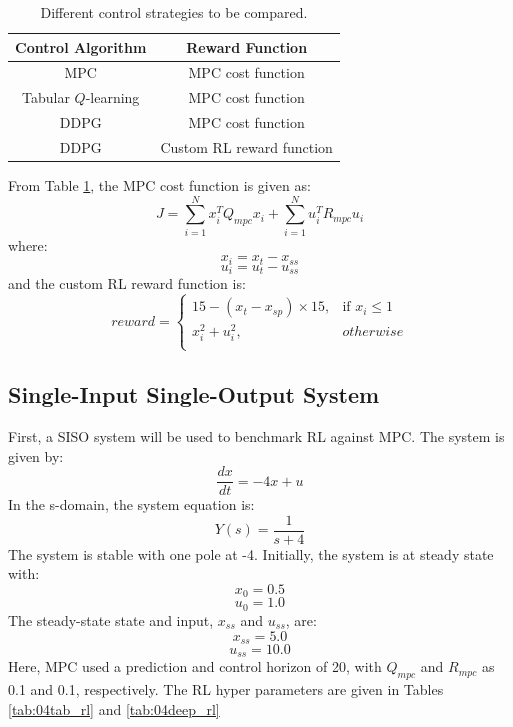 \begin{table}[H]
\caption{Different control strategies to be compared.}
\centering
\begin{tabular}{c|c}
\textbf{Control Algorithm} & \textbf{Reward Function}\\
\hline
MPC		                & MPC cost function		 \\
Tabular $Q$-learning    & MPC cost function		 \\
DDPG	                & MPC cost function		 \\
DDPG         	        & Custom RL reward function	
\label{tab:04control_and_cost}
\end{tabular}
\end{table}

From Table \ref{tab:04control_and_cost}, the MPC cost function is given as:
\begin{equation}
    J = \sum\limits^{N}_{i = 1} x_i^TQ_{mpc}x_i + \sum\limits^N_{i=1}u_i^TR_{mpc}u_i
    \label{eq:04mpc_cost}
\end{equation}
where:
$$x_i = x_t - x_{ss}$$ 
$$u_i = u_t - u_{ss}$$ 
and the custom RL reward function is:
\[
    reward = 
\begin{cases}
    15 - (x_t - x_{sp}) \times 15,              & \text{if } x_i \leq 1 \\
    x_i^2 + u_i^2,              & otherwise \\
    \label{eq:04rl_cost}
\end{cases}
\]

\subsection{Single-Input Single-Output System}
First, a SISO system will be used to benchmark RL against MPC.  The system is given by:
\begin{equation}
\dfrac{dx}{dt} = -4x + u
\end{equation}
\noindent
In the s-domain, the system equation is:
\begin{equation}
Y(s) = \dfrac{1}{s + 4}
\end{equation}
The system is stable with one pole at -4.  Initially, the system is at steady state with:
$$x_0 = 0.5$$
$$u_0 = 1.0$$
The steady-state state and input, $x_{ss}$ and $u_{ss}$, are:
$$x_{ss} = 5.0$$ 
$$u_{ss} = 10.0$$
Here, MPC used a prediction and control horizon of 20, with $Q_{mpc}$ and $R_{mpc}$ as 0.1 and 0.1, respectively.  The RL hyper parameters are given in Tables \ref{tab:04tab_rl} and \ref{tab:04deep_rl}

